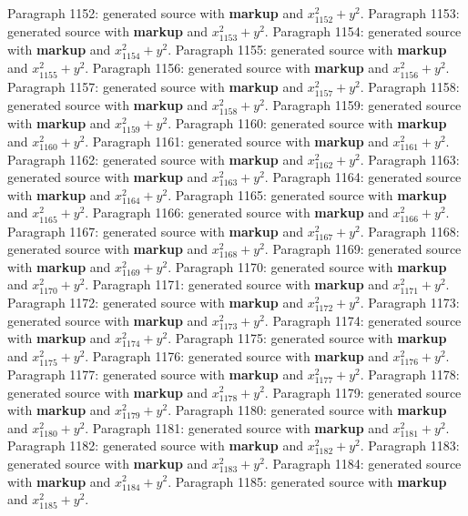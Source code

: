\documentclass{article}
\begin{document}
Paragraph 1152: generated source with \textbf{markup} and $x_{1152}^2 + y^2$.
Paragraph 1153: generated source with \textbf{markup} and $x_{1153}^2 + y^2$.
Paragraph 1154: generated source with \textbf{markup} and $x_{1154}^2 + y^2$.
Paragraph 1155: generated source with \textbf{markup} and $x_{1155}^2 + y^2$.
Paragraph 1156: generated source with \textbf{markup} and $x_{1156}^2 + y^2$.
Paragraph 1157: generated source with \textbf{markup} and $x_{1157}^2 + y^2$.
Paragraph 1158: generated source with \textbf{markup} and $x_{1158}^2 + y^2$.
Paragraph 1159: generated source with \textbf{markup} and $x_{1159}^2 + y^2$.
Paragraph 1160: generated source with \textbf{markup} and $x_{1160}^2 + y^2$.
Paragraph 1161: generated source with \textbf{markup} and $x_{1161}^2 + y^2$.
Paragraph 1162: generated source with \textbf{markup} and $x_{1162}^2 + y^2$.
Paragraph 1163: generated source with \textbf{markup} and $x_{1163}^2 + y^2$.
Paragraph 1164: generated source with \textbf{markup} and $x_{1164}^2 + y^2$.
Paragraph 1165: generated source with \textbf{markup} and $x_{1165}^2 + y^2$.
Paragraph 1166: generated source with \textbf{markup} and $x_{1166}^2 + y^2$.
Paragraph 1167: generated source with \textbf{markup} and $x_{1167}^2 + y^2$.
Paragraph 1168: generated source with \textbf{markup} and $x_{1168}^2 + y^2$.
Paragraph 1169: generated source with \textbf{markup} and $x_{1169}^2 + y^2$.
Paragraph 1170: generated source with \textbf{markup} and $x_{1170}^2 + y^2$.
Paragraph 1171: generated source with \textbf{markup} and $x_{1171}^2 + y^2$.
Paragraph 1172: generated source with \textbf{markup} and $x_{1172}^2 + y^2$.
Paragraph 1173: generated source with \textbf{markup} and $x_{1173}^2 + y^2$.
Paragraph 1174: generated source with \textbf{markup} and $x_{1174}^2 + y^2$.
Paragraph 1175: generated source with \textbf{markup} and $x_{1175}^2 + y^2$.
Paragraph 1176: generated source with \textbf{markup} and $x_{1176}^2 + y^2$.
Paragraph 1177: generated source with \textbf{markup} and $x_{1177}^2 + y^2$.
Paragraph 1178: generated source with \textbf{markup} and $x_{1178}^2 + y^2$.
Paragraph 1179: generated source with \textbf{markup} and $x_{1179}^2 + y^2$.
Paragraph 1180: generated source with \textbf{markup} and $x_{1180}^2 + y^2$.
Paragraph 1181: generated source with \textbf{markup} and $x_{1181}^2 + y^2$.
Paragraph 1182: generated source with \textbf{markup} and $x_{1182}^2 + y^2$.
Paragraph 1183: generated source with \textbf{markup} and $x_{1183}^2 + y^2$.
Paragraph 1184: generated source with \textbf{markup} and $x_{1184}^2 + y^2$.
Paragraph 1185: generated source with \textbf{markup} and $x_{1185}^2 + y^2$.
\end{document}
